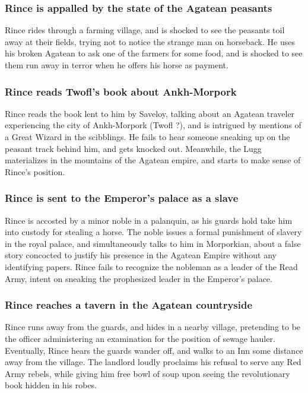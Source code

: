 \subsubsection{\Gls{Rince} is appalled by the state of the Agatean peasants}
\Gls{Rince} rides through a farming village, and is shocked to see the peasants toil away at their
fields, trying not to notice the strange man on horseback. He uses his broken Agatean to ask one
of the farmers for some food, and is shocked to see them run away in terror when he offers his horse
as payment.

\subsubsection{\Gls{Rince} reads \Gls{Twofl}'s book about Ankh-Morpork}
\Gls{Rince} reads the book lent to him by \Gls{Saveloy}, talking about an Agatean traveler
experiencing the city of Ankh-Morpork (\Gls{Twofl} ?), and is intrigued by mentions of a Great
Wizard in the scibblings. He fails to hear someone sneaking up on the peasant track behind him, and
gets knocked out. Meanwhile, the \Gls{Lugg} materializes in the mountains of the Agatean empire, and
starts to make sense of \Gls{Rince}'s position.

\subsubsection{\Gls{Rince} is sent to the Emperor's palace as a slave}
\Gls{Rince} is accosted by a minor noble in a palanquin, as his guards hold take him into custody
for stealing a horse. The noble issues a formal punishment of slavery in the royal palace, and
simultaneously talks to him in Morporkian, about a false story concocted to justify his presence in
the Agatean Empire without any identifying papers. \Gls{Rince} fails to recognize the nobleman as a
leader of the Read Army, intent on sneaking the prophesized leader in the Emperor's palace.

\subsubsection{\Gls{Rince} reaches a tavern in the Agatean countryside}
\Gls{Rince} runs away from the guards, and hides in a nearby village, pretending to be the officer
administering an examination for the position of sewage hauler. Eventually, \Gls{Rince} hears the
guards wander off, and walks to an Inn some distance away from the village. The landlord loudly
proclaims his refusal to serve any Red Army rebels, while giving him free bowl of soup upon seeing
the revolutionary book hidden in his robes.

